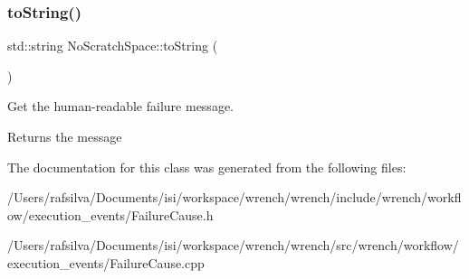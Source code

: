 \subsubsection{\texorpdfstring{to\+String()}{toString()}}
{\footnotesize\ttfamily std\+::string No\+Scratch\+Space\+::to\+String (\begin{DoxyParamCaption}{ }\end{DoxyParamCaption})}



Get the human-\/readable failure message. 

\begin{DoxyReturn}{Returns}
the message 
\end{DoxyReturn}


The documentation for this class was generated from the following files\+:\begin{DoxyCompactItemize}
\item 
/\+Users/rafsilva/\+Documents/isi/workspace/wrench/wrench/include/wrench/workflow/execution\+\_\+events/Failure\+Cause.\+h\item 
/\+Users/rafsilva/\+Documents/isi/workspace/wrench/wrench/src/wrench/workflow/execution\+\_\+events/Failure\+Cause.\+cpp\end{DoxyCompactItemize}
